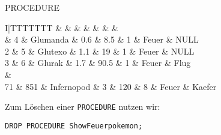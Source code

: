 \begin{sql}{PROCEDURE}
    \setcounter{rownum}{0}
    \begin{tabular}{I|TTTTTTT}
                                   &     &  &  &  &  &  &  \\                          & 4                         & Glumanda                 & 0.6                         & 8.5                         & 1                              & Feuer                          & NULL                             \\
        2                          & 5                         & Glutexo                  & 1.1                         & 19                          & 1                              & Feuer                          & NULL                             \\
        3                          & 6                         & Glurak                   & 1.7                         & 90.5                        & 1                              & Feuer                          & Flug                             \\
         &                                                                                                                                                                                              \\
        71                         & 851                       & Infernopod               & 3                           & 120                         & 8                              & Feuer                          & Kaefer                           \\
    \end{tabular}
    \vspace{1em}

    Zum Löschen einer \texttt{PROCEDURE} nutzen wir:

    \begin{lstlisting}[language=mysql]
        DROP PROCEDURE ShowFeuerpokemon;
    \end{lstlisting}
\end{sql}

